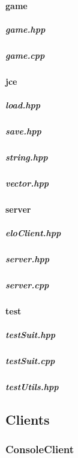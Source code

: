 \documentclass[12pt]{article}
\newcommand{\incFile}[2]{\label{code:#2}\newpage}
\begin{document}
\paragraph{game}															%
\subparagraph{game.hpp}												\incFile{C++}{AlphaZeroPytorch/include/game/game.hpp}\label{code:Game}
\subparagraph{game.cpp}												\incFile{C++}{AlphaZeroPytorch/include/game/game.cpp}

\paragraph{jce}																%
\subparagraph{load.hpp}												\incFile{C++}{AlphaZeroPytorch/include/jce/load.hpp}
\subparagraph{save.hpp}												\incFile{C++}{AlphaZeroPytorch/include/jce/save.hpp}
\subparagraph{string.hpp}												\incFile{C++}{AlphaZeroPytorch/include/jce/string.hpp}
\subparagraph{vector.hpp}											\incFile{C++}{AlphaZeroPytorch/include/jce/vector.hpp}

\paragraph{server}															%
\subparagraph{eloClient.hpp}										\incFile{C++}{AlphaZeroPytorch/include/Server/eloClient.hpp}
\subparagraph{server.hpp}												\incFile{C++}{AlphaZeroPytorch/include/Server/server.hpp}
\subparagraph{server.cpp}												\incFile{C++}{AlphaZeroPytorch/include/Server/server.cpp}

\paragraph{test}																%
\subparagraph{testSuit.hpp}											\incFile{C++}{AlphaZeroPytorch/include/test/testSuit.hpp}	
\subparagraph{testSuit.cpp}											\incFile{C++}{AlphaZeroPytorch/include/test/testSuit.cpp}
\subparagraph{testUtils.hpp}											\incFile{C++}{AlphaZeroPytorch/include/test/testUtils.hpp}

\subsection{Clients}														%
\subsubsection{ConsoleClient}
\end{document}
